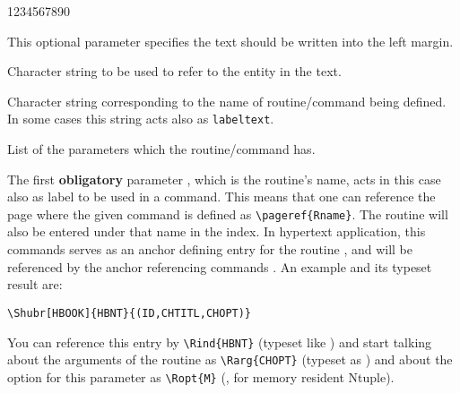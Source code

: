 \begin{DLtt}{1234567890}
\item[\Larg{margintext}] This optional parameter specifies the text
                         should be written into the left margin.
\item[\Larg{labeltext}]  Character string to be used to refer
                         to the entity in the text.
\item[\Larg{maintext}]   Character string corresponding to the name of
                         routine/command being defined. 
                         In some cases this string acts
                         also as \texttt{labeltext}.
\item[\Larg{parameters}] List of the parameters which the routine/command has.
\end{DLtt}


The first \textbf{obligatory} parameter , which is the
routine's name, acts in this
case also as label to be used in a  command.
This means that one can reference the page where the given command
is defined as \verb+\pageref{Rname}+.
The routine will also be entered under that name in the index.
In hypertext application, this commands serves as an anchor defining entry
for the routine , and will be referenced by the anchor
referencing commands .
An example and its typeset result are:

\begin{verbatim}
\Shubr[HBOOK]{HBNT}{(ID,CHTITL,CHOPT)}
\end{verbatim}


You can reference this entry by \verb!\Rind{HBNT}! (typeset like )
and start talking about the arguments of the routine as \verb!\Rarg{CHOPT}!
(typeset as ) and about the option for this  
parameter as \verb!\Ropt{M}! (\eg,  for memory resident Ntuple).


